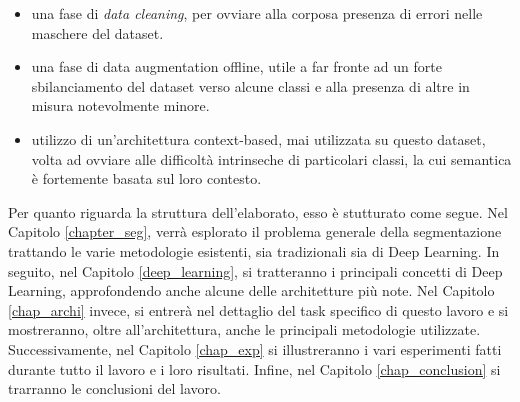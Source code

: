 \begin{itemize}
    \item una fase di \textit{data cleaning}, per ovviare alla corposa presenza di errori nelle maschere del dataset.
    
    \item una fase di data augmentation offline, utile a far fronte ad un forte sbilanciamento del dataset verso alcune classi e alla presenza di altre in misura notevolmente minore.
    
    \item utilizzo di un'architettura context-based, mai utilizzata su questo dataset, volta ad ovviare alle difficoltà intrinseche di particolari classi, la cui semantica è fortemente basata sul loro contesto.
\end{itemize}

Per quanto riguarda la struttura dell'elaborato, esso è stutturato come segue. Nel Capitolo \ref{chapter_seg}, verrà esplorato il problema generale della segmentazione trattando le varie metodologie esistenti, sia tradizionali sia di Deep Learning. In seguito, nel Capitolo \ref{deep_learning}, si tratteranno i principali concetti di Deep Learning, approfondendo anche alcune delle architetture più note. Nel Capitolo \ref{chap_archi} invece, si entrerà nel dettaglio del task specifico di questo lavoro e si mostreranno, oltre all'architettura, anche le principali metodologie utilizzate.
Successivamente, nel Capitolo \ref{chap_exp} si illustreranno i vari esperimenti fatti durante tutto il lavoro e i loro risultati. Infine, nel Capitolo \ref{chap_conclusion} si trarranno le conclusioni del lavoro.